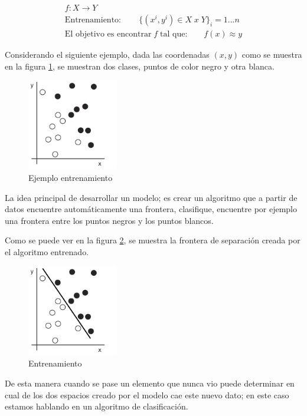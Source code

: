 \begin{eqnarray}
 f:X \longrightarrow Y\\
 \mbox{Entrenamiento}:\qquad \{(x^i, y^i) \in X\; x\; Y \} _i=1...n\\
 \mbox{El objetivo es encontrar}\; f\; \mbox{tal que:}\qquad f(x)\approx y
\end{eqnarray}

Considerando el siguiente ejemplo, dada las coordenadas $ (x,y)$ como se muestra en la figura \ref{Fig:ejemplo-1}, se muestran dos clases, puntos de color negro y otra blanca.
\begin{figure}[H] \centering
  \includegraphics[height=4cm,keepaspectratio=true,clip=true]{imagenes/MarcoTeorico/sample.png}
  \caption{Ejemplo entrenamiento}\label{Fig:ejemplo-1}
\end{figure}

La idea principal de desarrollar un modelo; es crear un algoritmo que a partir de datos encuentre automáticamente una frontera, clasifique, encuentre por ejemplo una frontera entre los puntos negros y los puntos blancos.

Como se puede ver en la figura \ref{Fig:ejemplo-2}, se muestra la frontera de separación creada por el algoritmo entrenado.
\begin{figure}[H] \centering
  \includegraphics[height=4cm,keepaspectratio=true,clip=true]{imagenes/MarcoTeorico/sample-fit-1.png}
  \caption{Entrenamiento}\label{Fig:ejemplo-2}
\end{figure}

De esta manera cuando se pase un elemento que nunca vio puede determinar en cual de los dos espacios creado por el modelo cae este nuevo dato; en este caso estamos hablando en un algoritmo de clasificación.


